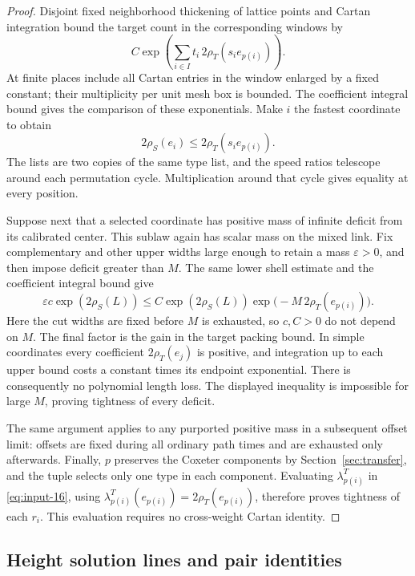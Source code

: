 \begin{proof}
Disjoint fixed neighborhood thickening of lattice points and Cartan
integration bound the target count in the corresponding windows by
\[
 C\exp\!\left(\sum_{i\in I}t_i\,2\rho_T(s_i e_{p(i)})\right).
\]
At finite places include all Cartan entries in the window enlarged by a
fixed constant; their multiplicity per unit mesh box is bounded.  The
coefficient integral bound gives the comparison of these exponentials.
Make $i$ the fastest coordinate to obtain
\[
 2\rho_S(e_i)\leq2\rho_T(s_i e_{p(i)}).
\]
The lists are two copies of the same type list, and the speed ratios
telescope around each permutation cycle.  Multiplication around that
cycle gives equality at every position.

Suppose next that a selected coordinate has positive mass of infinite
deficit from its calibrated center. This sublaw again has scalar mass on
the mixed link. Fix complementary and other upper widths large enough to
retain a mass $\varepsilon>0$, and then impose deficit greater than $M$.
The same lower shell estimate and the coefficient integral bound give
\[
 \varepsilon c\exp(2\rho_S(L))
 \le C\exp(2\rho_S(L))
         \exp\bigl(-M\,2\rho_T(e_{p(i)})\bigr).
\]
Here the cut widths are fixed before $M$ is exhausted, so $c,C>0$ do
not depend on $M$. The final factor is the gain in the target packing
bound. In simple coordinates every coefficient $2\rho_T(e_j)$ is
positive, and integration up to each upper bound costs a constant times
its endpoint exponential. There is consequently no polynomial length
loss. The displayed inequality is impossible for large $M$, proving
tightness of every deficit.

The same argument applies to any purported positive mass in a subsequent
offset limit: offsets are fixed during all ordinary path times and are
exhausted only afterwards. Finally, $p$ preserves the Coxeter components
by Section~\ref{sec:transfer}, and the tuple selects only one type in each
component. Evaluating $\lambda_{p(i)}^T$ in
\eqref{eq:input-16}, using
$\lambda_{p(i)}^T(e_{p(i)})=2\rho_T(e_{p(i)})$, therefore proves tightness
of each $r_i$. This evaluation requires no cross-weight Cartan identity.
\end{proof}

\subsection{Height solution lines and pair identities}

